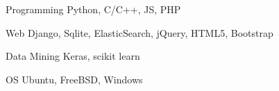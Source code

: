 

\begin{cvskills}

  \cvskill
    {Programming} %
    {Python, C/C++, JS, PHP} %

  \cvskill
    {Web} %
    {Django, Sqlite, ElasticSearch, jQuery, HTML5, Bootstrap} %

  \cvskill
    {Data Mining} %
    {Keras, scikit learn} %

  \cvskill
    {OS} %
    {Ubuntu, FreeBSD, Windows} %

\end{cvskills}

